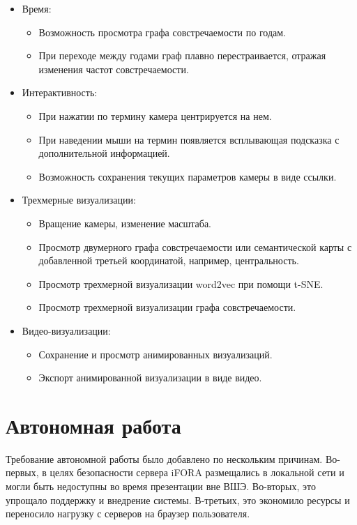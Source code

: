 \begin{itemize}
\item Время:
  \begin{itemize}
  \item Возможность просмотра графа совстречаемости по годам.
  \item При переходе между годами граф плавно перестраивается, отражая изменения частот совстречаемости.
  \end{itemize}

\item Интерактивность:
  \begin{itemize}
  \item При нажатии по термину камера центрируется на нем.
  \item При наведении мыши на термин появляется всплывающая подсказка с дополнительной информацией.
  \item Возможность сохранения текущих параметров камеры в виде ссылки.
  \end{itemize}

\item Трехмерные визуализации:
  \begin{itemize}
  \item Вращение камеры, изменение масштаба.
  \item Просмотр двумерного графа совстречаемости или семантической карты с добавленной третьей координатой, например, центральность.
  \item Просмотр трехмерной визуализации word2vec при помощи t-SNE.
  \item Просмотр трехмерной визуализации графа совстречаемости.
  \end{itemize}

\item Видео-визуализации:
  \begin{itemize}
  \item Сохранение и просмотр анимированных визуализаций.
  \item Экспорт анимированной визуализации в виде видео.
  \end{itemize}
\end{itemize}

\section{Автономная работа}

Требование автономной работы было добавлено по нескольким причинам. Во-первых, в целях безопасности сервера iFORA размещались в локальной сети и могли быть недоступны во время презентации вне ВШЭ. Во-вторых, это упрощало поддержку и внедрение системы. В-третьих, это экономило ресурсы и переносило нагрузку с серверов на браузер пользователя.

